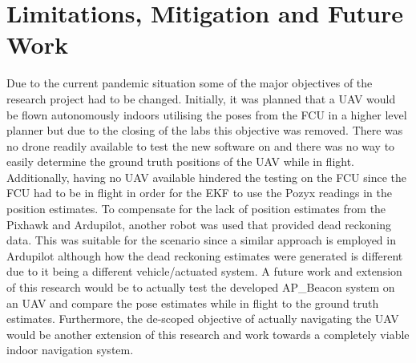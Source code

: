 \section{Limitations, Mitigation and Future Work}\label{sec:limitations,-mitigations-and-future-work}
Due to the current pandemic situation some of the major objectives of the research project had to be changed.
Initially, it was planned that a UAV would be flown autonomously indoors utilising the poses from the FCU in a higher level planner but due to the closing of the labs this objective was removed.
There was no drone readily available to test the new software on and there was no way to easily determine the ground truth positions of the UAV while in flight.
Additionally, having no UAV available hindered the testing on the FCU since the FCU had to be in flight in order for the EKF to use the Pozyx readings in the position estimates.
To compensate for the lack of position estimates from the Pixhawk and Ardupilot, another robot was used that provided dead reckoning data.
This was suitable for the scenario since a similar approach is employed in Ardupilot although how the dead reckoning estimates were generated is different due to it being a different vehicle/actuated system.
A future work and extension of this research would be to actually test the developed AP\_Beacon system on an UAV and compare the pose estimates while in flight to the ground truth estimates.
Furthermore, the de-scoped objective of actually navigating the UAV would be another extension of this research and work towards a completely viable indoor navigation system.

